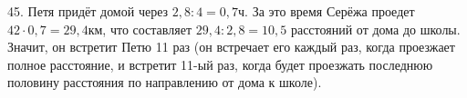 45. Петя придёт домой через $2,8:4=0,7$ч. За это время Серёжа проедет $42\cdot0,7=29,4$км, что составляет $29,4:2,8=10,5$ расстояний от дома до школы. Значит, он встретит Петю 11 раз (он встречает его каждый раз, когда проезжает полное расстояние, и встретит 11-ый раз, когда будет проезжать последнюю половину расстояния по направлению от дома к школе).\\
